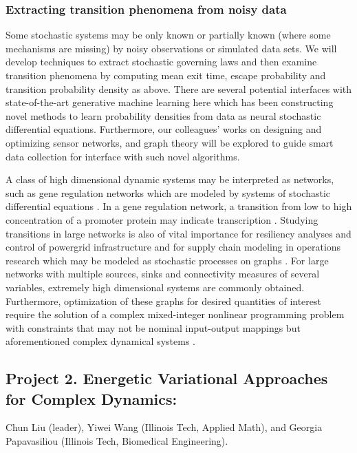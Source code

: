 \documentclass[11pt]{NSFamsart}
\begin{document}
 
\subsubsection*{Extracting transition phenomena from noisy data}
Some   stochastic systems may be only known or partially known (where some mechanisms are missing) by   noisy observations or simulated data sets. We will  develop techniques to extract stochastic governing laws \cite{YangLi2020a} and then examine transition phenomena by computing mean exit time, escape probability and transition probability density as above. 
There are several potential interfaces with state-of-the-art generative machine learning here which has been constructing novel methods to learn probability densities from data as neural stochastic differential equations. Furthermore, our colleagues'  works on 
designing and optimizing sensor networks, and graph theory \cite{karwa2016statistical,Calines2008MonitoringSF} will be explored to guide smart data collection for interface with such novel algorithms. 

A class of high dimensional dynamic systems may be interpreted as networks, such as   gene regulation networks \cite{Raser2005} which are modeled by systems of stochastic differential equations \cite{Suel06}.  In a gene regulation network, a transition from low to high concentration of a promoter protein may indicate transcription \cite{Stefan,ZLDK}. Studying transitions in large networks is also of vital importance for resiliency analyses and control of powergrid infrastructure and for supply chain modeling in operations research which may be modeled as stochastic processes on graphs \cite{shin2020graph,anghel2007stochastic,nardelli2014models}. For large networks with multiple sources, sinks and connectivity measures of several variables, extremely high dimensional systems are commonly obtained. Furthermore, optimization of these graphs for desired quantities of interest require the solution of a complex mixed-integer nonlinear programming problem with constraints that may not be nominal input-output mappings but aforementioned complex dynamical systems \cite{shin2020decentralized,sampat2017optimization,kim2019graph,shin2021exponential}.


\subsection*{Project 2. Energetic Variational Approaches for Complex Dynamics:}
Chun Liu (leader), Yiwei Wang (Illinois Tech, Applied Math), and Georgia Papavasiliou (Illinois Tech, Biomedical Engineering).
\end{document}
